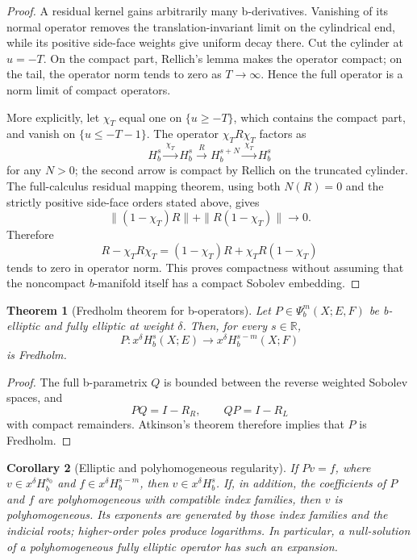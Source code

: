 \documentclass[12pt,oneside,reqno]{article}
\theoremstyle{plain}
\newtheorem{theorem}{Theorem}[section]
\newtheorem{corollary}[theorem]{Corollary}
\theoremstyle{definition}
\theoremstyle{remark}
\begin{document}
\begin{proof}
A residual kernel gains arbitrarily many b-derivatives. Vanishing of its
normal operator removes the translation-invariant limit on the cylindrical
end, while its positive side-face weights give uniform decay there. Cut
the cylinder at \(u=-T\). On the compact part, Rellich's lemma makes the
operator compact; on the tail, the operator norm tends to zero as
\(T\to\infty\). Hence the full operator is a norm limit of compact
operators.

More explicitly, let \(\chi_T\) equal one on \(\{u\geq-T\}\), which
contains the compact part, and vanish on \(\{u\leq-T-1\}\). The operator
\(\chi_TR\chi_T\) factors as
\[
 H_b^s\xrightarrow{\,\chi_T\,}H_b^s\xrightarrow{\,R\,}H_b^{s+N}
 \xrightarrow{\,\chi_T\,}H_b^s
\]
for any \(N>0\); the second arrow is compact by Rellich on the truncated
cylinder. The full-calculus residual mapping theorem, using both
\(N(R)=0\) and the strictly positive side-face orders stated above, gives
\[
 \|(1-\chi_T)R\|+\|R(1-\chi_T)\|\longrightarrow0.
\]
Therefore
\[
 R-\chi_TR\chi_T
 =(1-\chi_T)R+\chi_TR(1-\chi_T)
\]
tends to zero in operator norm. This proves compactness without assuming
that the noncompact \(b\)-manifold itself has a compact Sobolev embedding.
\end{proof}

\begin{theorem}[Fredholm theorem for b-operators]
Let \(P\in\Psi_b^m(X;E,F)\) be b-elliptic and fully elliptic at weight
\(\delta\). Then, for every \(s\in\mathbb R\),
\[
 P:x^\delta H_b^s(X;E)
 \longrightarrow
 x^\delta H_b^{s-m}(X;F)
\]
is Fredholm.
\end{theorem}

\begin{proof}
The full b-parametrix \(Q\) is bounded between the reverse weighted Sobolev
spaces, and
\[
 PQ=I-R_R,\qquad QP=I-R_L
\]
with compact remainders. Atkinson's theorem therefore implies that \(P\)
is Fredholm.
\end{proof}

\begin{corollary}[Elliptic and polyhomogeneous regularity]
If \(Pv=f\), where \(v\in x^\delta H_b^{s_0}\) and
\(f\in x^\delta H_b^{s-m}\), then \(v\in x^\delta H_b^s\). If, in
addition, the coefficients of \(P\) and \(f\) are polyhomogeneous with
compatible index families, then \(v\) is polyhomogeneous. Its exponents
are generated by those index families and the indicial roots; higher-order
poles produce logarithms. In particular, a null-solution of a
polyhomogeneous fully elliptic operator has such an expansion.
\end{corollary}
\end{document}
